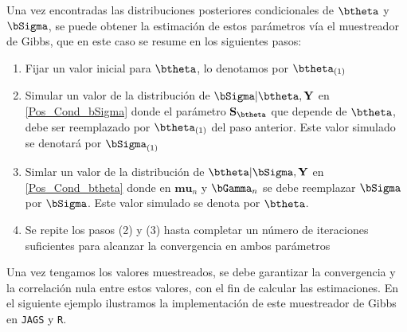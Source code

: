 Una vez encontradas las distribuciones posteriores condicionales de $\btheta$ y $\bSigma$, se puede obtener la estimación de estos parámetros vía el muestreador de Gibbs, que en este caso se resume en los siguientes pasos:
\begin{enumerate}[(1)]
\item Fijar un valor inicial para $\btheta$, lo denotamos por $\btheta_{(1)}$
\item Simular un valor de la distribución de $\bSigma|\btheta,\mathbf{Y}$ en \ref{Pos_Cond_bSigma} donde el parámetro $\mathbf{S_\mathbf{\btheta}}$ que depende de $\btheta$, debe ser reemplazado por $\btheta_{(1)}$ del paso anterior. Este valor simulado se denotará por $\bSigma_{(1)}$
\item  Simlar un valor de la distribución de $\btheta|\bSigma,\mathbf{Y}$ en \ref{Pos_Cond_btheta} donde en $\mathbf{mu}_n$ y $\bGamma_n$ se debe reemplazar $\bSigma$ por $\bSigma$. Este valor simulado se denota por $\btheta$.
\item Se repite los pasos (2) y (3) hasta completar un número de iteraciones suficientes para alcanzar la convergencia en ambos parámetros
\end{enumerate}
Una vez tengamos los valores muestreados, se debe garantizar la convergencia y la correlación nula entre estos valores, con el fin de calcular las estimaciones. En el siguiente ejemplo ilustramos la implementación de este muestreador de Gibbs en \verb'JAGS' y \verb'R'.

